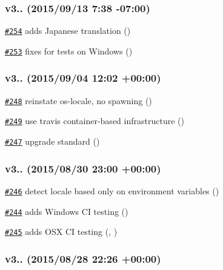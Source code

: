 \subsubsection*{v3.. (2015/09/13 7\+:38 -\/07\+:00)}


\begin{DoxyItemize}
\item \href{https://github.com/bcoe/yargs/pull/254}{\tt \#254} adds Japanese translation ()
\item \href{https://github.com/bcoe/yargs/pull/253}{\tt \#253} fixes for tests on Windows ()
\end{DoxyItemize}

\subsubsection*{v3.. (2015/09/04 12\+:02 +00\+:00)}


\begin{DoxyItemize}
\item \href{https://github.com/bcoe/yargs/pull/248}{\tt \#248} reinstate os-\/locale, no spawning ()
\item \href{https://github.com/bcoe/yargs/pull/249}{\tt \#249} use travis container-\/based infrastructure ()
\item \href{https://github.com/bcoe/yargs/pull/247}{\tt \#247} upgrade standard ()
\end{DoxyItemize}

\subsubsection*{v3.. (2015/08/30 23\+:00 +00\+:00)}


\begin{DoxyItemize}
\item \href{https://github.com/bcoe/yargs/pull/246}{\tt \#246} detect locale based only on environment variables ()
\item \href{https://github.com/bcoe/yargs/pull/244}{\tt \#244} adds Windows CI testing ()
\item \href{https://github.com/bcoe/yargs/pull/245}{\tt \#245} adds O\+SX CI testing (, )
\end{DoxyItemize}

\subsubsection*{v3.. (2015/08/28 22\+:26 +00\+:00)}


